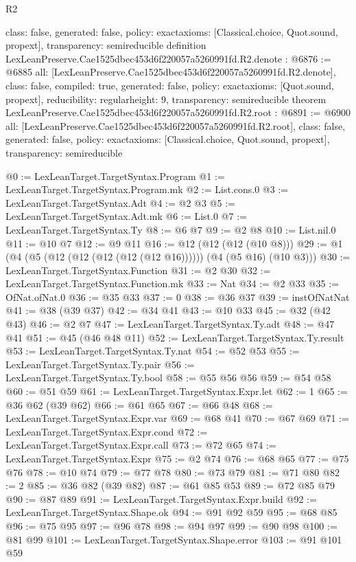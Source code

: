 \begin{lexlean}{R2}
\begin{coremodule}
{  class: false,
  generated: false,
  policy: exact{axioms: [Classical.choice, Quot.sound, propext]},
  transparency: semireducible
}
definition LexLeanPreserve.Cae1525dbec453d6f220057a5260991fd.R2.denote : @6876 := @6885 {
  all: [LexLeanPreserve.Cae1525dbec453d6f220057a5260991fd.R2.denote],
  class: false,
  compiled: true,
  generated: false,
  policy: exact{axioms: [Quot.sound, propext]},
  reducibility: regular{height: 9},
  transparency: semireducible
}
theorem LexLeanPreserve.Cae1525dbec453d6f220057a5260991fd.R2.root : @6891 := @6900 {
  all: [LexLeanPreserve.Cae1525dbec453d6f220057a5260991fd.R2.root],
  class: false,
  generated: false,
  policy: exact{axioms: [Classical.choice, Quot.sound, propext]},
  transparency: semireducible
}

@0 := LexLeanTarget.TargetSyntax.Program
@1 := LexLeanTarget.TargetSyntax.Program.mk
@2 := List.cons.{0}
@3 := LexLeanTarget.TargetSyntax.Adt
@4 := @2 @3
@5 := LexLeanTarget.TargetSyntax.Adt.mk
@6 := List.{0}
@7 := LexLeanTarget.TargetSyntax.Ty
@8 := @6 @7
@9 := @2 @8
@10 := List.nil.{0}
@11 := @10 @7
@12 := @9 @11
@16 := @12 (@12 (@12 (@10 @8)))
@29 := @1 (@4 (@5 (@12 (@12 (@12 (@12 (@12 @16)))))) (@4 (@5 @16) (@10 @3)))
@30 := LexLeanTarget.TargetSyntax.Function
@31 := @2 @30
@32 := LexLeanTarget.TargetSyntax.Function.mk
@33 := Nat
@34 := @2 @33
@35 := OfNat.ofNat.{0}
@36 := @35 @33
@37 := 0
@38 := @36 @37
@39 := instOfNatNat
@41 := @38 (@39 @37)
@42 := @34 @41
@43 := @10 @33
@45 := @32 (@42 @43)
@46 := @2 @7
@47 := LexLeanTarget.TargetSyntax.Ty.adt
@48 := @47 @41
@51 := @45 (@46 @48 @11)
@52 := LexLeanTarget.TargetSyntax.Ty.result
@53 := LexLeanTarget.TargetSyntax.Ty.nat
@54 := @52 @53
@55 := LexLeanTarget.TargetSyntax.Ty.pair
@56 := LexLeanTarget.TargetSyntax.Ty.bool
@58 := @55 @56 @56
@59 := @54 @58
@60 := @51 @59
@61 := LexLeanTarget.TargetSyntax.Expr.let
@62 := 1
@65 := @36 @62 (@39 @62)
@66 := @61 @65
@67 := @66 @48
@68 := LexLeanTarget.TargetSyntax.Expr.var
@69 := @68 @41
@70 := @67 @69
@71 := LexLeanTarget.TargetSyntax.Expr.cond
@72 := LexLeanTarget.TargetSyntax.Expr.call
@73 := @72 @65
@74 := LexLeanTarget.TargetSyntax.Expr
@75 := @2 @74
@76 := @68 @65
@77 := @75 @76
@78 := @10 @74
@79 := @77 @78
@80 := @73 @79
@81 := @71 @80
@82 := 2
@85 := @36 @82 (@39 @82)
@87 := @61 @85 @53
@89 := @72 @85 @79
@90 := @87 @89
@91 := LexLeanTarget.TargetSyntax.Expr.build
@92 := LexLeanTarget.TargetSyntax.Shape.ok
@94 := @91 @92 @59
@95 := @68 @85
@96 := @75 @95
@97 := @96 @78
@98 := @94 @97
@99 := @90 @98
@100 := @81 @99
@101 := LexLeanTarget.TargetSyntax.Shape.error
@103 := @91 @101 @59

\end{coremodule}
\end{lexlean}
